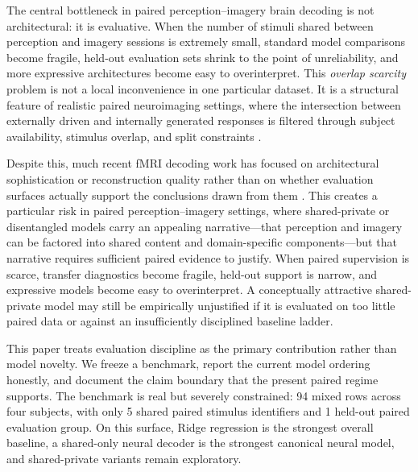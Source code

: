 \documentclass{article}
\begin{document}
The central bottleneck in paired perception--imagery brain decoding is not
architectural: it is evaluative.  When the number of stimuli shared between
perception and imagery sessions is extremely small, standard model comparisons
become fragile, held-out evaluation sets shrink to the point of unreliability,
and more expressive architectures become easy to overinterpret.  This
\emph{overlap scarcity} problem is not a local inconvenience in one particular
dataset.  It is a structural feature of realistic paired neuroimaging settings,
where the intersection between externally driven and internally generated
responses is filtered through subject availability, stimulus overlap, and split
constraints
\citep{pearson2019imagery,horikawa2017generic,dijkstra2018temporal}.

Despite this, much recent fMRI decoding work has focused on architectural
sophistication or reconstruction quality rather than on whether evaluation
surfaces actually support the conclusions drawn from them
\citep{takagi2023high,radford2021clip}.  This creates a particular risk in
paired perception--imagery settings, where shared-private or disentangled models
carry an appealing narrative---that perception and imagery can be factored into
shared content and domain-specific components---but that narrative requires
sufficient paired evidence to justify.  When paired supervision is scarce,
transfer diagnostics become fragile, held-out support is narrow, and expressive
models become easy to overinterpret.  A conceptually attractive shared-private
model may still be empirically unjustified if it is evaluated on too little
paired data or against an insufficiently disciplined baseline ladder.

This paper treats evaluation discipline as the primary contribution rather than
model novelty.  We freeze a benchmark, report the current model ordering
honestly, and document the claim boundary that the present paired regime
supports.  The benchmark is real but severely constrained: 94 mixed rows across
four subjects, with only 5 shared paired stimulus identifiers and 1 held-out
paired evaluation group.  On this surface, Ridge regression is the strongest
overall baseline, a shared-only neural decoder is the strongest canonical neural
model, and shared-private variants remain exploratory.
\end{document}
